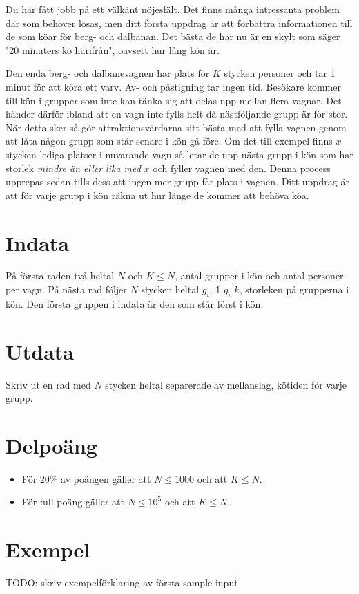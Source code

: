 Du har fått jobb på ett välkänt nöjesfält. Det finns många intressanta problem där som behöver lösas, men ditt första uppdrag är att förbättra informationen till de som köar för berg- och dalbanan. Det bästa de har nu är en skylt som säger "20 minuters kö härifrån", oavsett hur lång kön är.

Den enda berg- och dalbanevagnen har plats för $K$ stycken personer och tar 1 minut för att köra ett varv. Av- och påstigning tar ingen tid. Besökare kommer till kön i grupper som inte kan tänka sig att delas upp mellan flera vagnar. Det händer därför ibland att en vagn inte fylls helt då nästföljande grupp är för stor. När detta sker så gör attraktionsvärdarna sitt bästa med att fylla vagnen genom att låta någon grupp som står senare i kön gå före. Om det till exempel finns $x$ stycken lediga platser i nuvarande vagn så letar de upp nästa grupp i kön som har storlek \emph{mindre än eller lika med} $x$ och fyller vagnen med den. Denna process upprepas sedan tills dess att ingen mer grupp får plats i vagnen. Ditt uppdrag är att för varje grupp i kön räkna ut hur länge de kommer att behöva köa.

\section*{Indata}
På första raden två heltal $N$ och $K \leq N$, antal grupper i kön och antal personer per vagn. På nästa rad följer $N$ stycken heltal $g_i$, 1 \leq $g_i$ \leq $k$, storleken på grupperna i kön. Den första gruppen i indata är den som står först i kön.

\section*{Utdata}
Skriv ut en rad med $N$ stycken heltal separerade av mellanslag, kötiden för varje grupp.

\section*{Delpoäng}
\begin{itemize}
\item För 20\% av poängen gäller att $N \leq 1000$ och att $K \leq N$.
\item För full poäng gäller att $N \leq 10^{5}$ och att $K \leq N$.
\end{itemize}

\section*{Exempel}
TODO: skriv exempelförklaring av första sample input
